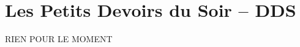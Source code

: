 \documentclass[
	fontsize=10pt, %
	twoside=true, %
]{kaobook}
\newcommand{\repRel}{}
\newcommand{\repStyle}{\repRel/Style}
\begin{document}
%
%
%

%
\mainmatter %


\setcounter{margintocdepth}{\sectiontocdepth}
\marginlayout
\graphicspath{{\repStyle/png}}

\pagestyle{xp.scrheadings}


\newcommand{\repExo}{Application_01_ROV}
\newcommand{\nomExo}{Application_01_ROV}

\livrettrue %
\collefalse
\normaltrue
\setcounter{cptApplication}{1}
\setcounter{cptTD}{1}
\newcommand{\exer}{\subsection*}
\newcommand{\td}{}


\setcounter{decsec}{159} %

\renewcommand{\exer}[1]{
    \stepcounter{decsec}
    \addtocounter{decsec}{-2} %
    \section*{Exercice \arabic{decsec} -- #1}
    \addtocounter{subparagraph}{-1} %
}

\chapter*{Les Petits Devoirs du Soir -- DDS}

RIEN POUR LE MOMENT
\allCompWideMP
%
\end{document}
